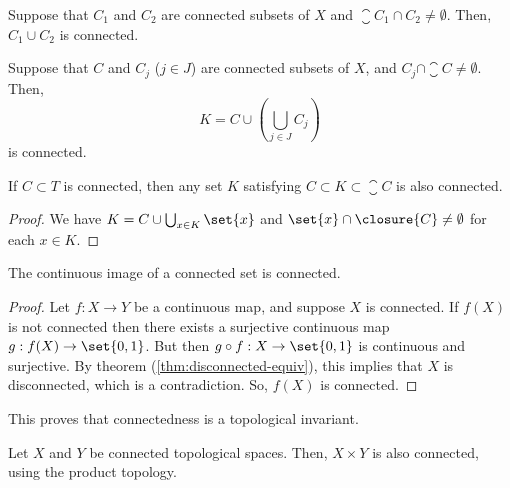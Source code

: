 \begin{nprop}\label{thm:connected-check-b}
  Suppose that $C_1$ and $C_2$ are connected subsets of $X$ and $\closure{C_1} \cap C_2 \neq \emptyset$. Then, $C_1 \cup C_2$ is connected.
\end{nprop}

\begin{nthm}\label{thm:connected-check-c}
  Suppose that $C$ and $C_j$ ($j \in J$) are connected subsets of $X$, and $C_j \cap \closure{C} \neq \emptyset$. Then,
  \begin{equation*}
    K = C \cup \left(\bigcup_{j \in J} C_j\right)
  \end{equation*}
  is connected.
\end{nthm}

\begin{ncor}\label{thm:connected-check-d}
  If $C \subset T$ is connected, then any set $K$ satisfying $C \subset K \subset \closure{C}$ is also connected.
\end{ncor}
\begin{proof}
  We have $K = C \cup \bigcup_{x \in K} \set{x}$ and $\set{x} \cap \closure{C} \neq \emptyset$ for each $x \in K$.
\end{proof}

\begin{nthm}\label{thm:connected-invariant}
  The continuous image of a connected set is connected.
\end{nthm}
\begin{proof}
  Let $f: X \to Y$ be a continuous map, and suppose $X$ is connected. If $f(X)$ is not connected then there exists a surjective continuous map $g: f(X) \to \set{0,1}$. But then $g \circ f: X \to \set{0,1}$ is continuous and surjective. By theorem (\ref{thm:disconnected-equiv}), this implies that $X$ is disconnected, which is a contradiction. So, $f(X)$ is connected.
\end{proof}
This proves that connectedness is a topological invariant.

\begin{nthm}\label{thm:connected-product}
  Let $X$ and $Y$ be connected topological spaces. Then, $X \times Y$ is also connected, using the product topology.
\end{nthm}

